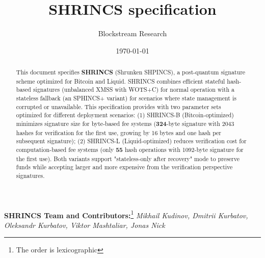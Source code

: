\documentclass[10pt, a4paper]{article}
\title{SHRINCS specification}
\author{Blockstream Research}
\date{\today}
\begin{document}
\maketitle

\begin{abstract}
  This document specifies \textbf{SHRINCS} (Shrunken SHPINCS), a post-quantum signature scheme optimized for Bitcoin and Liquid. SHRINCS combines efficient stateful hash-based signatures (unbalanced XMSS with WOTS+C) for normal operation with a stateless fallback (an SPHINCS+ variant) for scenarios where state management is corrupted or unavailable. This specification provides with two parameter sets optimized for different deployment scenarios: (1) SHRINCS-B (Bitcoin-optimized) minimizes signature size for byte-based fee systems (\textbf{324}-byte signature with 2043 hashes for verification for the first use, growing by 16 bytes and one hash per subsequent signature); (2) SHRINCS-L (Liquid-optimized) reduces verification cost for computation-based fee systems (only \textbf{55} hash operations with 1092-byte signature for the first use). Both variants support "stateless-only after recovery" mode to preserve funds while accepting larger and more expensive from the verification perspective signatures. 
\end{abstract}

\textbf{SHRINCS Team and Contributors:}\footnote{The order is lexicographic}
\textit{Mikhail Kudinov, Dmitrii Kurbatov, Oleksandr Kurbatov, Viktor Mashtaliar, Jonas Nick}

\tableofcontents

\newpage























\printbibliography{}

\appendix


\end{document}
